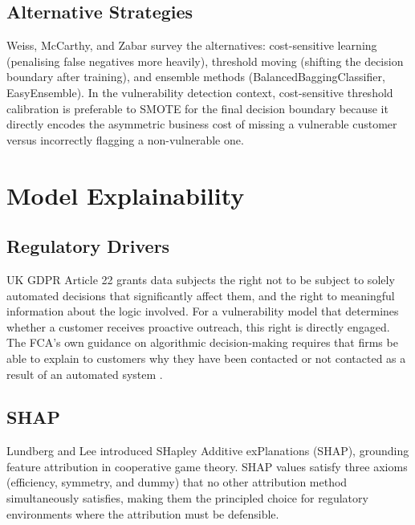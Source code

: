 \documentclass[12pt, a4paper]{article}
\begin{document}
\subsection{Alternative Strategies}

Weiss, McCarthy, and Zabar \cite{weiss2007} survey the alternatives: cost-sensitive
learning (penalising false negatives more heavily), threshold moving (shifting the
decision boundary after training), and ensemble methods (BalancedBaggingClassifier,
EasyEnsemble).
In the vulnerability detection context, cost-sensitive threshold calibration is
preferable to SMOTE for the final decision boundary because it directly encodes
the asymmetric business cost of missing a vulnerable customer versus incorrectly
flagging a non-vulnerable one.

\section{Model Explainability}

\subsection{Regulatory Drivers}

UK GDPR Article 22 grants data subjects the right not to be subject to solely
automated decisions that significantly affect them, and the right to meaningful
information about the logic involved.
For a vulnerability model that determines whether a customer receives proactive
outreach, this right is directly engaged.
The FCA's own guidance on algorithmic decision-making requires that firms be able
to explain to customers why they have been contacted or not contacted as a result
of an automated system \cite{fca2023ai}.

\subsection{SHAP}

Lundberg and Lee \cite{lundberg2017} introduced SHapley Additive exPlanations (SHAP),
grounding feature attribution in cooperative game theory.
SHAP values satisfy three axioms (efficiency, symmetry, and dummy) that no other
attribution method simultaneously satisfies, making them the principled choice
for regulatory environments where the attribution must be defensible.
\end{document}

